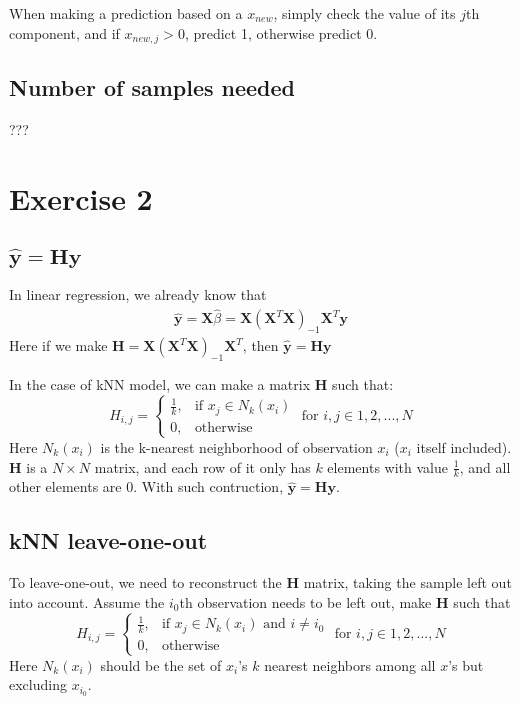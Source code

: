 \documentclass[12pt]{article}
\begin{document}
When making a prediction based on a $x_{new}$, 
simply check the value of its $j$th component,
and if $x_{new, j}>0$, predict 1,
otherwise predict 0.

\subsection{Number of samples needed}
???


\section{Exercise 2}

\subsection{$\hat{\bm{y}}=\bm{H}\bm{y}$}
In linear regression, we already know that
\begin{align*}
	\hat{\bm{y}} = \bm{X} \hat{\beta} = \bm{X}(\bm{X}^T\bm{X})_{-1} \bm{X}^T \bm{y}
\end{align*}
Here if we make $\bm{H} = \bm{X}(\bm{X}^T\bm{X})_{-1} \bm{X}^T$, 
then $\hat{\bm{y}}=\bm{H}\bm{y}$

In the case of kNN model, we can make a matrix $\bm{H}$ such that:
\[
	H_{i,j} = 
	\begin{cases}
		\frac{1}{k}, & \text{if } x_j \in N_k(x_i) \\
		0, & \text{otherwise}
	\end{cases}
	\text{ for } i, j \in 1,2,..., N
\]
Here $N_k(x_i)$ is the k-nearest neighborhood of observation $x_i$ 
($x_i$ itself included).
$\bm{H}$ is a $N\times N$ matrix, and each row of it only has $k$ elements with value $\frac{1}{k}$, and all other elements are 0.
With such contruction, $\hat{\bm{y}}=\bm{H}\bm{y}$.


\subsection{kNN leave-one-out}
To leave-one-out, we need to reconstruct the $\bm{H}$ matrix,
taking the sample left out into account.
Assume the $i_0$th observation needs to be left out, 
make $\bm{H}$ such that
\[
	H_{i,j} = 
	\begin{cases}
		\frac{1}{k}, & \text{if } x_j \in N_k(x_i) \text{ and } i \neq i_0 \\
		0, & \text{otherwise}
	\end{cases}
	\text{ for } i, j \in 1,2,..., N
\]
Here $N_k(x_i)$ should be the set of $x_i$'s $k$ nearest neighbors among all $x$'s but excluding $x_{i_0}$.
\end{document}
